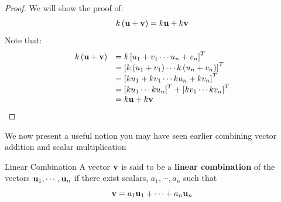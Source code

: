 \ifdefined\showproofs
\begin{proof}
We will show the proof of: 
\begin{equation*}
k \left( \mathbf{u}+\mathbf{v}\right) = k \mathbf{u}+ k \mathbf{v}
\end{equation*}
Note that:
\begin{equation*}
\begin{array}{ll}
k \left( \mathbf{u}+\mathbf{v}\right) & =k \left[ u_{1}+v_{1} \cdots u_{n}+v_{n}\right]^T \\
& = \left[ k \left( u_{1}+v_{1}\right) \cdots k \left( u_{n}+v_{n}\right) \right]^T \\
& = \left[ k u_{1}+ k  v_{1} \cdots k u_{n}+ k v_{n}\right]^T \\
& = \left[ k u_{1} \cdots k u_{n} \right]^T + \left[ k v_{1} \cdots k v_{n} \right]^T \\
& = k \mathbf{u}+k \mathbf{v} \\
\end{array}
\end{equation*}
\end{proof}
\fi
We now present a useful notion you may have seen earlier combining vector addition and scalar multiplication

\begin{definition}{Linear Combination}\label{def:linearcombination}
A vector $\mathbf{v}$ is said to be a \textbf{linear combination }
 of the vectors $\mathbf{u}_1,\cdots , \mathbf{u}_n $ 
if there exist scalars, $a_{1},\cdots ,a_{n}$ such
that
\begin{equation*}
\mathbf{v} = a_1 \mathbf{u}_1 + \cdots + a_n \mathbf{u}_n
\end{equation*}
\end{definition}


